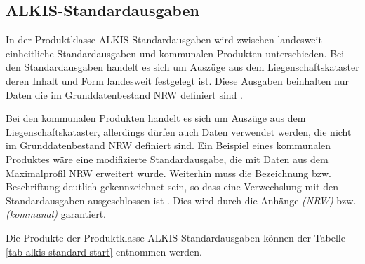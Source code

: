 \subsection{ALKIS-Standardausgaben}

In der Produktklasse ALKIS-Standardausgaben wird zwischen landesweit einheitliche Standardausgaben und kommunalen Produkten unterschieden.
Bei den Standardausgaben handelt es sich um Auszüge aus dem Liegenschaftskataster deren Inhalt und Form landesweit festgelegt ist.
Diese Ausgaben beinhalten nur Daten die im Grunddatenbestand NRW definiert sind \autocite[vgl.][8]{bezk-grunddaten}.

Bei den kommunalen Produkten handelt es sich um Auszüge aus dem Liegenschaftskataster, allerdings dürfen auch Daten verwendet werden, die nicht im Grunddatenbestand NRW definiert sind.
Ein Beispiel eines kommunalen Produktes wäre eine modifizierte Standardausgabe, die mit Daten aus dem Maximalprofil NRW erweitert wurde.
Weiterhin muss die Bezeichnung bzw. Beschriftung deutlich gekennzeichnet sein, so dass eine Verwechslung mit den Standardausgaben ausgeschlossen ist \autocite[vgl.][9]{bezk-grunddaten}.
Dies wird durch die Anhänge \textit{(NRW)} bzw. \textit{(kommunal)} garantiert.

Die Produkte der Produktklasse ALKIS-Standardausgaben können der Tabelle \ref{tab-alkis-standard-start}  entnommen werden.

